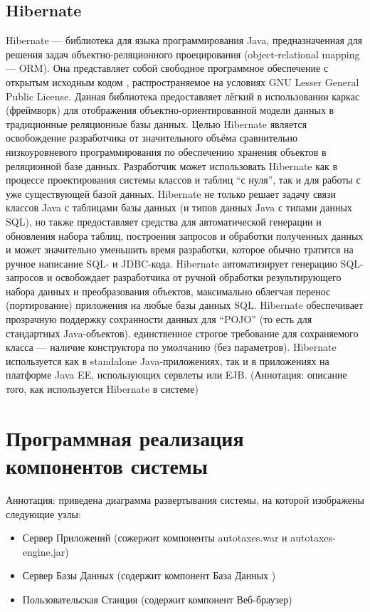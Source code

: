 \documentclass[14pt,a4paper]{reportmod}
\begin{document}
\subsection{Hibernate}
Hibernate — библиотека для языка программирования Java, предназначенная для решения задач объектно-реляционного проецирования (object-relational mapping — ORM). Она представляет собой свободное программное обеспечение с открытым исходным кодом , распространяемое на условиях GNU Lesser General Public License. Данная библиотека предоставляет лёгкий в использовании каркас (фреймворк) для отображения объектно-ориентированной модели данных в традиционные реляционные базы данных.
Целью Hibernate является освобождение разработчика от значительного объёма сравнительно низкоуровневого программирования по обеспечению хранения объектов в реляционной базе данных. Разработчик может использовать Hibernate как в процессе проектирования системы классов и таблиц ``с нуля'', так и для работы с уже существующей базой данных.
Hibernate не только решает задачу связи классов Java с таблицами базы данных (и типов данных Java с типами данных SQL), но также предоставляет средства для автоматической генерации и обновления набора таблиц, построения запросов и обработки полученных данных и может значительно уменьшить время разработки, которое обычно тратится на ручное написание SQL- и JDBC-кода. Hibernate автоматизирует генерацию SQL-запросов и освобождает разработчика от ручной обработки результирующего набора данных и преобразования объектов, максимально облегчая перенос (портирование) приложения на любые базы данных SQL.
Hibernate обеспечивает прозрачную поддержку сохранности данных  для ``POJO'' (то есть для стандартных Java-объектов). единственное строгое требование для сохраняемого класса — наличие конструктора по умолчанию (без параметров).
Hibernate используется как в standalone Java-приложениях, так и в приложениях на платформе Java EE, использующих сервлеты или EJB.
(Аннотация: описание того, как используется Hibernate в системе)

\section{Программная реализация компонентов системы}
Аннотация: приведена диаграмма развертывания системы, на которой изображены следующие узлы:
\begin{itemize}
  \item Сервер Приложений (сожержит компоненты autotaxes.war и autotaxes-engine.jar)
  \item Сервер Базы Данных (содержит компонент База Данных )
  \item Пользовательская Станция (содержит компонент Веб-браузер)
\end{itemize}
\end{document}
